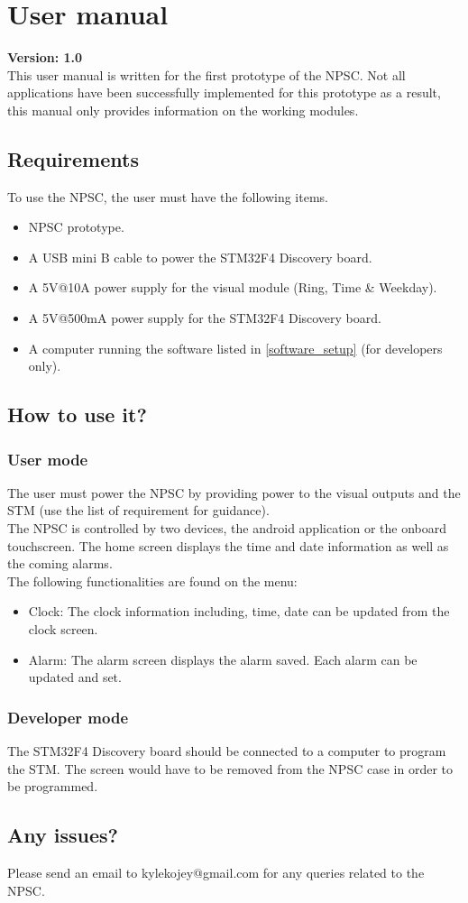 \chapter{User manual}
\textbf{Version: 1.0}\\
This user manual is written for the first prototype of the NPSC. Not all applications have been successfully implemented for this prototype as a result, this manual only provides information on the working modules.

\section{Requirements}
To use the NPSC, the user must have the following items.
\begin{itemize}
	\item NPSC prototype.
	\item A USB mini B cable to power the STM32F4 Discovery board.
	\item A 5V@10A power supply for the visual module (Ring, Time \& Weekday).
	\item A 5V@500mA power supply for the STM32F4 Discovery board.
	\item A computer running the software listed in \ref{software_setup} (for developers only).
\end{itemize}

\section{How to use it?}
\subsection{User mode}
The user must power the NPSC by providing power to the visual outputs and the STM (use the list of requirement for guidance).\\
The NPSC is controlled by two devices, the android application or the onboard touchscreen. The home screen displays the time and date information as well as the coming alarms.\\
The following functionalities are found on the menu:
\begin{itemize}
	\item Clock: The clock information including, time, date can be updated from the clock screen.
	\item Alarm: The alarm screen displays the alarm saved. Each alarm can be updated and set. 
\end{itemize}

\subsection{Developer mode}
The STM32F4 Discovery board should be connected to a computer to program the STM. The screen would have to be removed from the NPSC case in order to be programmed.

\section{Any issues?}
Please send an email to kylekojey@gmail.com for any queries related to the NPSC.